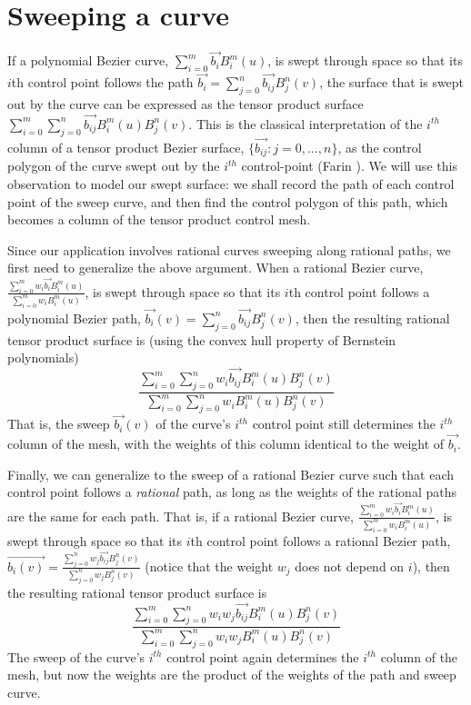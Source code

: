 \section{Sweeping a curve}
\label{sec:theory}

If a polynomial Bezier curve, $\sum_{i=0}^{m} \vec{b_i} B_{i}^{m}(u)$,
is swept through space so that its $i$th control point follows the path 
$\vec{b_i} = \sum_{j=0}^{n} \vec{b_{ij}} B_{j}^{n}(v)$,
the surface that is swept out by the curve
can be expressed as the tensor product surface 
$\sum_{i=0}^{m} \sum_{j=0}^{n} \vec{b_{ij}} B_{i}^{m}(u) B_{j}^{n}(v)$.
This is the classical interpretation of the $i^{th}$ column of a tensor
product Bezier surface, $\{\vec{b_{ij}}: j=0,\ldots,n\}$, 
as the control polygon of the curve swept out by the $i^{th}$ control-point
(Farin \cite{farin93}).
We will use this observation to model our swept surface:
we shall record the path of each control point of the
sweep curve, and then find the control polygon
of this path, which becomes a column of the tensor product control mesh.

Since our application involves rational curves sweeping along rational paths,
we first need to generalize the above argument.
When a rational Bezier curve,
$\frac{\sum_{i=0}^{m} w_i \vec{b_i} B_i^{m}(u)}{\sum_{i=0}^{m} w_i B_i^{m}(u)}$,
is swept through space so that its $i$th control point follows
a polynomial Bezier path, 
$\vec{b_{i}}(v) = \sum_{j=0}^{n} \vec{b_{ij}} B_{j}^{n}(v)$,
then the resulting rational tensor product surface is
(using the convex hull property of Bernstein polynomials)
\[
\frac{\sum_{i=0}^{m} \sum_{j=0}^n w_i \vec{b_{ij}} B_i^{m}(u) B_j^n(v)}
{\sum_{i=0}^{m} \sum_{j=0}^n  w_i B_i^{m}(u) B_j^n(v)}
\]
That is, the sweep $\vec{b_{i}}(v)$ of the curve's $i^{th}$ control point still
determines the $i^{th}$ column of the mesh,
with the weights of this column identical to the weight of $\vec{b_i}$.

Finally, we can generalize to the sweep of a rational Bezier
curve such that each control point follows a {\em rational} path,
as long as the weights of the rational paths are the same for each path.
That is, if a rational Bezier curve,
$\frac{\sum_{i=0}^{m} w_i \vec{b_i} B_i^{m}(u)}{\sum_{i=0}^{m} w_i B_i^{m}(u)}$,
is swept through space so that its $i$th control point follows
a rational Bezier path, 
$\vec{b_i(v)} = \frac{\sum_{j=0}^{n} w_j \vec{b_{ij}} B_{j}^{n}(v)}
{\sum_{j=0}^{n} w_j B_{j}^{n}(v)}$
(notice that the weight $w_j$ does not depend on $i$),
then the resulting rational tensor product surface is
\begin{equation}
\label{eq:ratrat}
\frac{\sum_{i=0}^{m} \sum_{j=0}^n w_i w_j \vec{b_{ij}} B_i^{m}(u) B_j^n(v)}
{\sum_{i=0}^{m} \sum_{j=0}^n w_i w_j B_i^{m}(u) B_j^n(v)}
\end{equation}
The sweep of the curve's $i^{th}$ control point again determines the
$i^{th}$ column of the mesh,
but now the weights are the product of the weights of the path and sweep curve.

